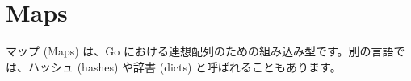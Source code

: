 \section{Maps}

マップ (Maps) は、Go における連想配列のための組み込み型です。別の言語では、ハッシュ (hashes) や辞書 (dicts) と呼ばれることもあります。




